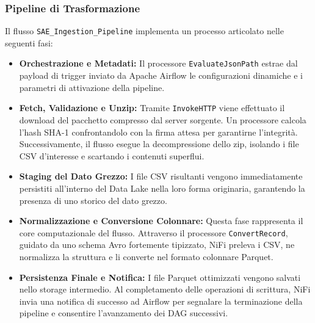 \documentclass[conference]{IEEEtran}
\begin{document}
\subsubsection{Pipeline di Trasformazione}
Il flusso \texttt{SAE\_Ingestion\_Pipeline} implementa un processo articolato nelle seguenti fasi:
\begin{itemize}
    \item \textbf{Orchestrazione e Metadati:} Il processore \texttt{EvaluateJsonPath} estrae dal payload di trigger inviato da Apache Airflow le configurazioni dinamiche e i parametri di attivazione della pipeline.
    \item \textbf{Fetch, Validazione e Unzip:} Tramite \texttt{InvokeHTTP} viene effettuato il download del pacchetto compresso dal server sorgente.
    Un processore calcola l'hash SHA-1 confrontandolo con la firma attesa per garantirne l'integrità.
    Successivamente, il flusso esegue la decompressione dello zip, isolando i file CSV d'interesse e scartando i contenuti superflui.
    \item \textbf{Staging del Dato Grezzo:} I file CSV risultanti vengono immediatamente persistiti all'interno del Data Lake nella loro forma originaria, garantendo la presenza di uno storico del dato grezzo.
    \item \textbf{Normalizzazione e Conversione Colonnare:} Questa fase rappresenta il core computazionale del flusso.
    Attraverso il processore \texttt{ConvertRecord}, guidato da uno schema Avro fortemente tipizzato, NiFi preleva i CSV, ne normalizza la struttura e li converte nel formato colonnare Parquet.
    \item \textbf{Persistenza Finale e Notifica:} I file Parquet ottimizzati vengono salvati nello storage intermedio.
    Al completamento delle operazioni di scrittura, NiFi invia una notifica di successo ad Airflow per segnalare la terminazione della pipeline e consentire l'avanzamento dei DAG successivi.
\end{itemize}
\end{document}
